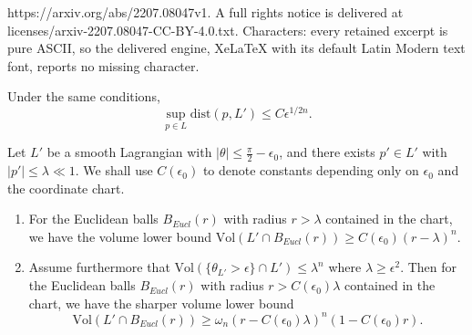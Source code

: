 \documentclass[10pt,a4paper]{amsart}
\begin{document}
https://arxiv.org/abs/2207.08047v1. A full rights notice is delivered at licenses/arxiv-2207.08047-CC-BY-4.0.txt. Characters: every retained excerpt is pure ASCII, so the delivered engine, XeLaTeX with its default Latin Modern text font, reports no missing character.
\begin{cor}\label{HalfHausdorff}
Under the same conditions,
\begin{equation}
\sup_{p\in L} \text{dist}(p,L') \leq C\epsilon^{1/2n}.
\end{equation}
\end{cor}

\begin{prop}\label{monotonicity}
	Let $L'$ be a smooth Lagrangian with $|\theta|\leq \frac{\pi}{2}-\epsilon_0$, and 
	there exists $p'\in L'$ with $|p'|\leq \lambda\ll 1$. We shall use $C(\epsilon_0)$ to denote constants depending only on $\epsilon_0$ and the coordinate chart.
\begin{enumerate}
	\item 
For the Euclidean balls $B_{Eucl}(r)$  with radius $r>\lambda$ contained in the chart, we have the volume lower bound $\text{Vol}(L'\cap B_{Eucl}(r))\geq C(\epsilon_0)(r-\lambda)^n$.
	
	\item Assume furthermore that $\text{Vol}( \{ \theta_{L'}> \epsilon   \}\cap L' ) \leq \lambda^n $ where $\lambda\geq \epsilon^2$. Then for  the Euclidean balls $B_{Eucl}(r)$  with radius $r>C(\epsilon_0)\lambda$ contained in the chart, we have the sharper volume lower bound
\begin{equation}
\text{Vol}(L'\cap B_{Eucl}(r)) \geq \omega_n (r-C(\epsilon_0)\lambda)^n (1-C(\epsilon_0)r).
\end{equation}
\end{enumerate}


\end{prop}
\end{document}
